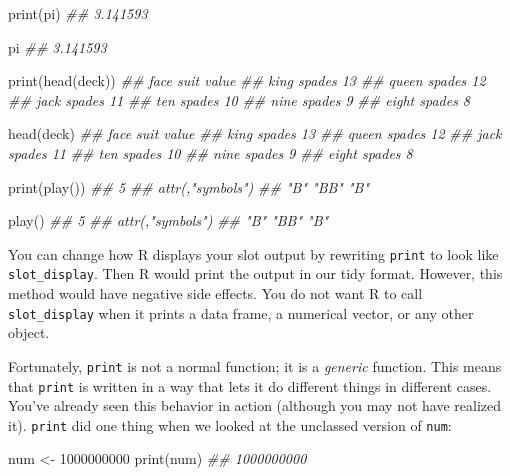 \documentclass[
  letterpaper,
  DIV=11,
  numbers=noendperiod]{scrbook}
\newenvironment{Shaded}{\begin{snugshade}}{\end{snugshade}}
\newcommand{\DecValTok}[1]{\textcolor[rgb]{0.68,0.00,0.00}{#1}}
\newcommand{\DocumentationTok}[1]{\textcolor[rgb]{0.37,0.37,0.37}{\textit{#1}}}
\newcommand{\FunctionTok}[1]{\textcolor[rgb]{0.28,0.35,0.67}{#1}}
\newcommand{\NormalTok}[1]{\textcolor[rgb]{0.00,0.23,0.31}{#1}}
\newcommand{\OtherTok}[1]{\textcolor[rgb]{0.00,0.23,0.31}{#1}}
\begin{document}
\begin{Shaded}
\begin{Highlighting}[]
\FunctionTok{print}\NormalTok{(pi)}
\DocumentationTok{\#\# 3.141593}

\NormalTok{pi}
\DocumentationTok{\#\# 3.141593}


\FunctionTok{print}\NormalTok{(}\FunctionTok{head}\NormalTok{(deck))}
\DocumentationTok{\#\#  face   suit value}
\DocumentationTok{\#\#  king spades    13}
\DocumentationTok{\#\# queen spades    12}
\DocumentationTok{\#\#  jack spades    11}
\DocumentationTok{\#\#   ten spades    10}
\DocumentationTok{\#\#  nine spades     9}
\DocumentationTok{\#\# eight spades     8}

\FunctionTok{head}\NormalTok{(deck)}
\DocumentationTok{\#\#  face   suit value}
\DocumentationTok{\#\#  king spades    13}
\DocumentationTok{\#\# queen spades    12}
\DocumentationTok{\#\#  jack spades    11}
\DocumentationTok{\#\#   ten spades    10}
\DocumentationTok{\#\#  nine spades     9}
\DocumentationTok{\#\# eight spades     8}


\FunctionTok{print}\NormalTok{(}\FunctionTok{play}\NormalTok{())}
\DocumentationTok{\#\#  5}
\DocumentationTok{\#\# attr(,"symbols")}
\DocumentationTok{\#\#  "B"  "BB" "B" }

\FunctionTok{play}\NormalTok{()}
\DocumentationTok{\#\#  5}
\DocumentationTok{\#\# attr(,"symbols")}
\DocumentationTok{\#\#  "B"  "BB" "B" }
\end{Highlighting}
\end{Shaded}

You can change how R displays your slot output by rewriting
\texttt{print} to look like \texttt{slot\_display}. Then R would print
the output in our tidy format. However, this method would have negative
side effects. You do not want R to call \texttt{slot\_display} when it
prints a data frame, a numerical vector, or any other object.

Fortunately, \texttt{print} is not a normal function; it is a
\emph{generic} function. This means that \texttt{print} is written in a
way that lets it do different things in different cases. You've already
seen this behavior in action (although you may not have realized it).
\texttt{print} did one thing when we looked at the unclassed version of
\texttt{num}:

\begin{Shaded}
\begin{Highlighting}[]
\NormalTok{num }\OtherTok{\textless{}{-}} \DecValTok{1000000000}
\FunctionTok{print}\NormalTok{(num)}
\DocumentationTok{\#\# 1000000000}
\end{Highlighting}
\end{Shaded}
\end{document}
